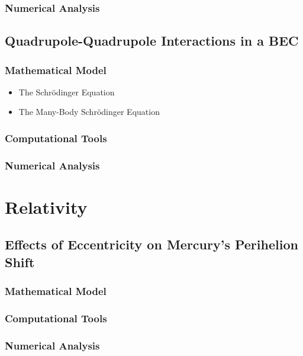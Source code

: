 \documentclass{report}
\begin{document}
        \subsection{Numerical Analysis}

    \section{Quadrupole-Quadrupole Interactions in a BEC}

        \subsection{Mathematical Model}

            \begin{itemize}
                \item The Schr{\"o}dinger Equation
                \item The Many-Body Schr{\"o}dinger Equation
            \end{itemize}

        \subsection{Computational Tools}

        \subsection{Numerical Analysis}

\chapter{Relativity} \label{sec:relativity}

    \section{Effects of Eccentricity on Mercury's Perihelion Shift}

        \subsection{Mathematical Model}

        \subsection{Computational Tools}

        \subsection{Numerical Analysis}
\end{document}

